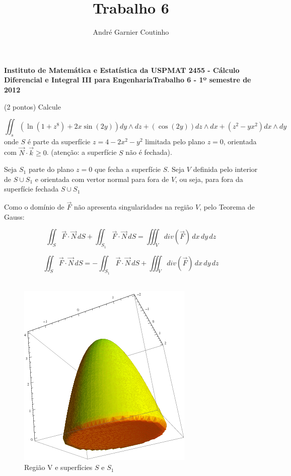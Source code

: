 \documentclass[12pt,a4paper]{article}
\title{Trabalho 6}
\author{André Garnier Coutinho}
\begin{document}
\begin{center}
\textbf{Instituto de Matemática e Estatística da USP\linebreak MAT 2455 - Cálculo Diferencial e Integral III para Engenharia\linebreak Trabalho 6 - 1º semestre de 2012}
\end{center}



 (2 pontos) Calcule

\[ \iint_{s} ( \ln (1+z^8) + 2x \sin(2y)) dy \wedge dz + (\cos(2y))dz \wedge dx + (z^2 - yx^2)dx \wedge dy \]
onde $S$ é parte da superfície $z = 4 - 2x^2 - y^2 $ limitada pelo plano $z = 0$, orientada com $ \vec{N} \cdot \vec{k} \geq 0 $. (atenção: a superfície $S$ não é fechada).


Seja $S_1$ parte do plano $z=0$ que fecha a superfície $S$. Seja $V$ definida pelo interior de $S \cup S_1 $ e orientada com vertor normal  para fora de $V$, ou seja, para fora da superfície fechada $S \cup S_1$

Como o domínio de $\vec{F} $ não apresenta singularidades na região $V$, pelo Teorema de Gauss:

\[ \iint_{S} \vec{F}  \cdot \vec{N} \,dS + \iint_{ S_1 } \vec{F}  \cdot \vec{N} \,dS = \iiint_{V} div(\vec{F})  \,dx \,dy \,dz  \]



\begin{equation}
\iint_{S} \vec{F}  \cdot \vec{N} \,dS = - \iint_{ S_1 } \vec{F}   \cdot \vec{N} \,dS  + \iiint_{V} div(\vec{F}) \,dx \,dy \,dz
\label{eq:1}
\end{equation} \\


\begin{figure}[h!]
	\centering
	\includegraphics[scale=0.5]{1a.png}  
	\caption{Região V e superfícies $S$ e $S_1$ }
	\label{fig:figura1}
\end{figure} \\
\end{document}
